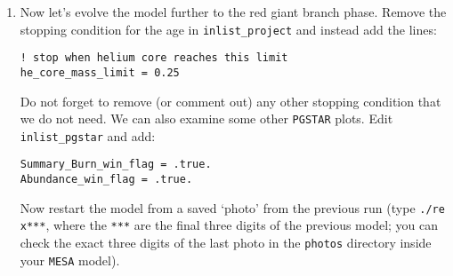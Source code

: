 \documentclass[11pt,a4paper]{article}
\begin{document}
\begin{enumerate}
\item Now let's evolve the model further to the red giant branch phase. Remove the stopping condition for the age in \verb|inlist_project| and instead add the lines:
\begin{lstlisting}
! stop when helium core reaches this limit
he_core_mass_limit = 0.25
\end{lstlisting}
Do not forget to remove (or comment out) any other stopping condition that we do not need. We can also examine some other \texttt{PGSTAR} plots. Edit \verb|inlist_pgstar| and add:
\begin{lstlisting}
Summary_Burn_win_flag = .true.
Abundance_win_flag = .true.
\end{lstlisting}
Now restart the model from a saved `photo' from the previous run (type \verb|./re x***|, where the \verb|***| are the final three digits of the previous model; you can check the exact three digits of the last photo in the \texttt{photos} directory inside your \texttt{MESA} model).


\end{enumerate}
\end{document}
